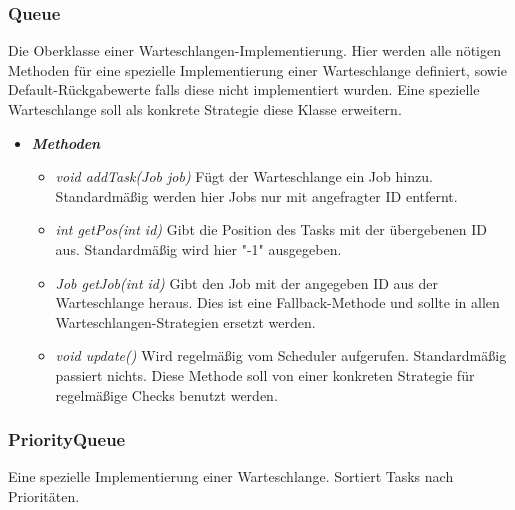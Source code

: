 \documentclass[a4paper,12pt]{article}
\begin{document}
\subsubsection{Queue}

Die Oberklasse einer Warteschlangen-Implementierung. Hier werden alle nötigen Methoden für eine spezielle Implementierung einer Warteschlange definiert, sowie Default-Rückgabewerte falls diese nicht implementiert wurden. Eine spezielle Warteschlange soll als konkrete Strategie diese Klasse erweitern.

\begin{itemize}[label={}]

\item \textit{\textbf{Methoden}}
\begin{itemize}[label={\textbullet}]
	
	\item \textit{void addTask(Job job)} Fügt der Warteschlange ein Job hinzu. Standardmäßig werden hier Jobs nur mit angefragter ID entfernt.

\item \textit{int getPos(int id)} Gibt die Position des Tasks mit der übergebenen ID aus. Standardmäßig wird hier "-1" ausgegeben.

\item \textit{Job getJob(int id)} Gibt den Job mit der angegeben ID aus der Warteschlange heraus. Dies ist eine Fallback-Methode und sollte in allen Warteschlangen-Strategien ersetzt werden. 

\item \textit{void update()} Wird regelmäßig vom Scheduler aufgerufen. Standardmäßig passiert nichts. Diese Methode soll von einer konkreten Strategie für regelmäßige Checks benutzt werden.

\end{itemize}

\end{itemize}

\subsubsection{PriorityQueue}

Eine spezielle Implementierung einer Warteschlange. Sortiert Tasks nach Prioritäten.
\end{document}
